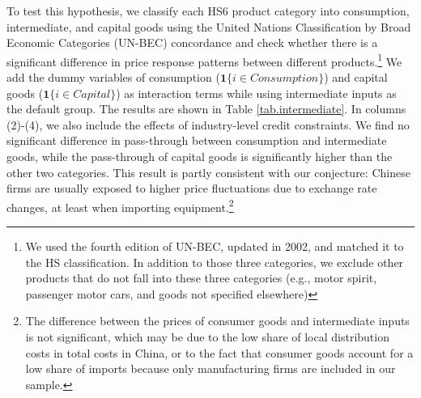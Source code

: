 To test this hypothesis, we classify each HS6 product category into consumption, intermediate, and capital goods using the United Nations Classification by Broad Economic Categories (UN-BEC) concordance and check whether there is a significant difference in price response patterns between different products.\footnote{We used the fourth edition of UN-BEC, updated in 2002, and matched it to the HS classification. In addition to those three categories, we exclude other products that do not fall into these three categories (e.g., motor spirit, passenger motor cars, and goods not specified elsewhere)} We add the dummy variables of consumption ($\mathbf{1}\{i \in Consumption\}$) and capital goods ($\mathbf{1}\{i \in Capital\}$) as interaction terms while using intermediate inputs as the default group. The results are shown in Table \ref{tab.intermediate}. In columns (2)-(4), we also include the effects of industry-level credit constraints. We find no significant difference in pass-through between consumption and intermediate goods, while the pass-through of capital goods is significantly higher than the other two categories. This result is partly consistent with our conjecture: Chinese firms are usually exposed to higher price fluctuations due to exchange rate changes, at least when importing equipment.\footnote{The difference between the prices of consumer goods and intermediate inputs is not significant, which may be due to the low share of local distribution costs in total costs in China, or to the fact that consumer goods account for a low share of imports because only manufacturing firms are included in our sample.}

